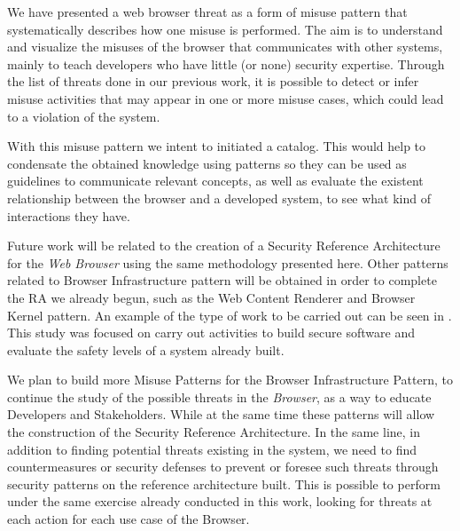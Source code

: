 \documentclass{sig-alternate-05-2015}
\begin{document}


We have presented a web browser threat as a form of misuse pattern that systematically describes how one misuse is performed. The aim is to understand and visualize the misuses of the browser that communicates with other systems, mainly to teach developers who have little (or none) security expertise. Through the list of threats done in our previous work, it is possible to detect or infer misuse activities that may appear in one or more misuse cases, which could lead to a violation of the system.

With this misuse pattern we intent to initiated a catalog. This would help to condensate the obtained knowledge using patterns so they can be used as guidelines to communicate relevant concepts, as well as evaluate the existent relationship between the browser and a developed system, to see what kind of interactions they have.

Future work will be related to the creation of a Security Reference Architecture for the \textit{Web Browser} using the same methodology presented here. Other patterns related to Browser Infrastructure pattern will be obtained in order to complete the RA we already begun, such as the Web Content Renderer and Browser Kernel pattern. An example of the type of work to be carried out can be seen in \cite{Fernandez2015}. This study was focused on carry out activities to build secure software and evaluate the safety levels of a system already built.

We plan to build more Misuse Patterns for the Browser Infrastructure Pattern, to continue the study of the possible threats in the \textit{Browser}, as a way to educate Developers and Stakeholders. While at the same time these patterns will allow the construction of the Security Reference Architecture. In the same line, in addition to finding potential threats existing in the system, we need to find countermeasures or security defenses to prevent or foresee such threats through security patterns on the reference architecture built. This is possible to perform under the same exercise already conducted in this work, looking for threats at each action for each use case of the Browser.

  

\end{document}
